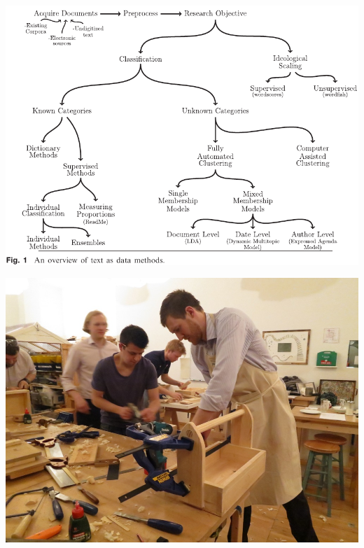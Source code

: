 \documentclass[20pt]{beamer}
\begin{document}
\begin{frame}
    \hspace*{-12mm}
    \href{http://pan.oxfordjournals.org/content/21/3/267}{\includegraphics[width=\paperwidth]{gs_fig1_scissored.pdf}}
\end{frame}


\begin{frame}
	\vspace*{-1mm}
	\hspace*{-12mm}
	\href{http://www.thegoodlifecentre.co.uk/wp-content/uploads/2012/05/IMG_1825.jpg}{\includegraphics[height=1.1\textheight]{IMG_1825.jpg}}
\end{frame}
\end{document}
